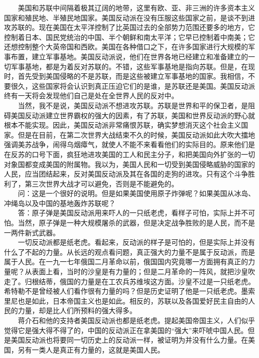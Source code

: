 \documentclass[cn,11pt,chinese]{elegantbook}
\begin{document}
　　美国和苏联中间隔着极其辽阔的地带，这里有欧、亚、非三洲的许多资本主义国家和殖民地、半殖民地国家。美国反动派在没有压服这些国家之前，是谈不到进攻苏联的。现在美国在太平洋控制了比英国过去的全部势力范围还要多的地方，它控制着日本、国民党统治的中国、半个朝鲜和南太平洋；它早已控制着中南美；它还想控制整个大英帝国和西欧。美国在各种借口之下，在许多国家进行大规模的军事布置，建立军事基地。美国反动派说，他们在世界各地已经建立和准备建立的一切军事基地，都是为着反对苏联的。不错，这些军事基地是指向苏联。但是，在现时，首先受到美国侵略的不是苏联，而是这些被建立军事基地的国家。我相信，不要很久，这些国家将会认识到真正压迫它们的是谁，是苏联还是美国。美国反动派终有一天将会发现他们自己是处在全世界人民的反对中。\\
　　当然，我不是说，美国反动派不想进攻苏联。苏联是世界和平的保卫者，是阻碍美国反动派建立世界霸权的强大的因素，有了苏联，美国和世界反动派的野心就根本不能实现。因此，美国反动派非常痛恨苏联，确实梦想消灭这个社会主义国家。但是在目前，在第二次世界大战结束不久的时候，美国反动派如此大吹大擂地强调美苏战争，闹得乌烟瘴气，就使人不能不来看看他们的实际目的。原来他们是在反苏的口号下面，疯狂地进攻美国的工人和民主分子，和把美国向外扩张的一切对象国都变成美国的附属物。我以为，美国人民和一切受到美国侵略威胁的国家的人民，应当团结起来，反对美国反动派及其在各国的走狗的进攻。只有这个斗争胜利了，第三次世界大战才可以避免，否则是不能避免的。\\
　　问：这是一个很好的说明。但是如果美国使用原子炸弹呢？如果美国从冰岛、冲绳岛以及中国的基地轰炸苏联呢？\\
　　答：原子弹是美国反动派用来吓人的一只纸老虎，看样子可怕，实际上并不可怕。当然，原子弹是一种大规模屠杀的武器，但是决定战争胜败的是人民，而不是一两件新式武器。\\
　　一切反动派都是纸老虎。看起来，反动派的样子是可怕的，但是实际上并没有什么了不起的力量。从长远的观点看问题，真正强大的力量不是属于反动派，而是属于人民。在一九一七年俄国二月革命以前，俄国国内究竟哪一方面拥有真正的力量呢？从表面上看，当时的沙皇是有力量的；但是二月革命的一阵风，就把沙皇吹走了。归根结蒂，俄国的力量是在工农兵苏维埃这方面。沙皇不过是一只纸老虎。希特勒不是曾经被人们看作很有力量的吗？但是历史证明了他是一只纸老虎。墨索里尼也是如此，日本帝国主义也是如此。相反的，苏联以及各国爱好民主自由的人民的力量，却是比人们所预料的强大得多。\\
　　蒋介石和他的支持者美国反动派也都是纸老虎。提起美国帝国主义，人们似乎觉得它是强大得不得了的，中国的反动派正在拿美国的“强大”来吓唬中国人民。但是美国反动派也将要同一切历史上的反动派一样，被证明为并没有什么力量。在美国，另有一类人是真正有力量的，这就是美国人民。\\
\end{document}
